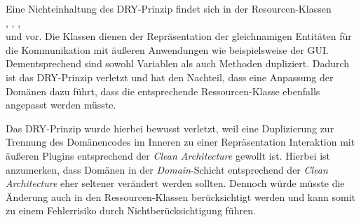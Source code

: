 Eine Nichteinhaltung des \ac{DRY}-Prinzip findet sich in der Resourcen-Klassen \\\href{https://github.com/lucasmerkel/dhbw-advancedswe-programmentwurf/blob/5764d7da4cfd0562ed8e96128e92f85c30b7309d/swe_programmentwurf/consumergoods-inventory-planner/1-cip-adapters/src/main/java/de/dhbw/cip/adapters/ConsumerGoodsResource.java}{}, \href{https://github.com/lucasmerkel/dhbw-advancedswe-programmentwurf/blob/5764d7da4cfd0562ed8e96128e92f85c30b7309d/swe_programmentwurf/consumergoods-inventory-planner/1-cip-adapters/src/main/java/de/dhbw/cip/adapters/FridgeResource.java}{}, \href{https://github.com/lucasmerkel/dhbw-advancedswe-programmentwurf/blob/5764d7da4cfd0562ed8e96128e92f85c30b7309d/swe_programmentwurf/consumergoods-inventory-planner/1-cip-adapters/src/main/java/de/dhbw/cip/adapters/FoodShelfResource.java}{}, \\\href{https://github.com/lucasmerkel/dhbw-advancedswe-programmentwurf/blob/5764d7da4cfd0562ed8e96128e92f85c30b7309d/swe_programmentwurf/consumergoods-inventory-planner/1-cip-adapters/src/main/java/de/dhbw/cip/adapters/FoodResource.java}{} und \href{https://github.com/lucasmerkel/dhbw-advancedswe-programmentwurf/blob/5764d7da4cfd0562ed8e96128e92f85c30b7309d/swe_programmentwurf/consumergoods-inventory-planner/1-cip-adapters/src/main/java/de/dhbw/cip/adapters/BestBeforeDateResource.java}{} vor.
Die Klassen dienen der Repräsentation der gleichnamigen Entitäten für die Kommunikation mit äußeren Anwendungen wie beispielsweise der \ac{GUI}.
Dementsprechend sind sowohl Variablen als auch Methoden dupliziert.
Dadurch ist das \ac{DRY}-Prinzip verletzt und hat den Nachteil, dass eine Anpassung der Domänen dazu führt, dass die entsprechende Ressourcen-Klasse ebenfalls angepasst werden müsste.

Das \ac{DRY}-Prinzip wurde hierbei bewusst verletzt, weil eine Duplizierung zur Trennung des Domänencodes im Inneren zu einer Repräsentation Interaktion mit äußeren Plugins entsprechend der \textit{Clean Architecture} gewollt ist.
Hierbei ist anzumerken, dass Domänen in der \textit{Domain}-Schicht entsprechend der \textit{Clean Architecture} eher seltener verändert werden sollten.
Dennoch würde müsste die Änderung auch in den Ressourcen-Klassen berücksichtigt werden und kann somit zu einem Fehlerrisiko durch Nichtberücksichtigung führen.
